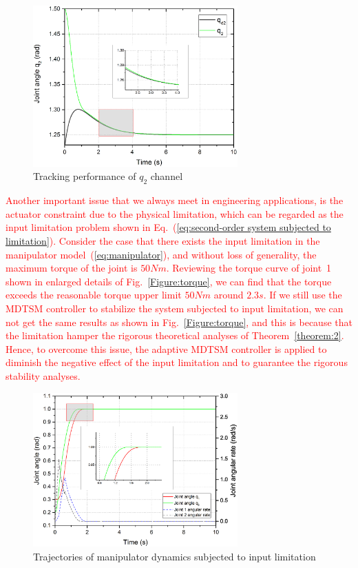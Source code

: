 \documentclass[3p]{elsarticle}
\theoremstyle{plain}
\theoremstyle{remark}
\begin{document}
\begin{figure}[http]
\centering
\includegraphics[width=0.7\textwidth]{paper3_fig7.eps}
\caption{Tracking performance of $q_2$ channel}
\label{Figure:7}
\end{figure}
\textcolor{red}{Another important issue that we always meet in engineering applications, is the actuator constraint due to the physical limitation, which can be regarded as the input limitation problem shown in Eq.~(\ref{eq:second-order system subjected to limitation}). Consider the case that there exists the input limitation in the manipulator model~(\ref{eq:manipulator}), and without loss of generality, the maximum torque of the joint is $50Nm$. Reviewing the torque curve of joint~1  shown in enlarged details of  Fig.~\ref{Figure:torque}, we can find that the torque exceeds the reasonable torque upper limit $50Nm$ around $2.3s$. If we still use the MDTSM controller to stabilize the system subjected to input limitation, we can not get the same results as shown in Fig.~\ref{Figure:torque}, and this is because that the limitation hamper the rigorous theoretical analyses of Theorem~\ref{theorem:2}. Hence, to overcome this issue, the adaptive MDTSM controller is applied to diminish the negative effect of the input limitation and to guarantee the rigorous stability analyses.}
\begin{figure}
\centering
\includegraphics[width=0.7\textwidth]{paper3_fig_limitation_q.eps}
\caption{Trajectories of manipulator dynamics subjected to input limitation}
\label{Figure:limitation_q}
\end{figure}
\end{document}
